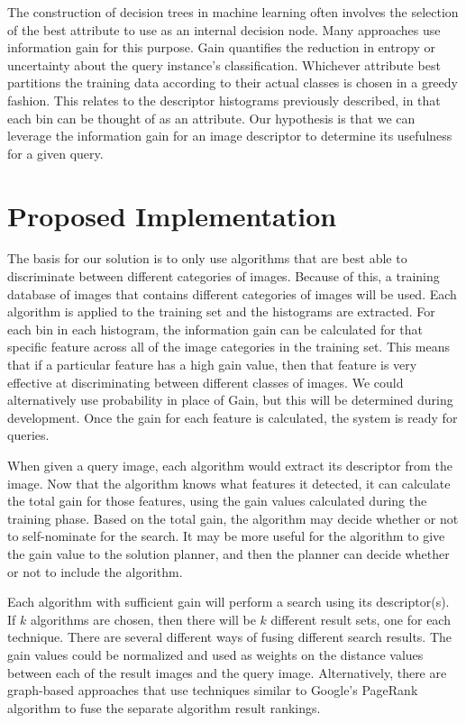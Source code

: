 \documentclass[12pt]{article}
\begin{document}
The construction of decision trees in machine learning often involves the selection of the best attribute to use as an internal decision node. Many approaches use information gain for this purpose. Gain quantifies the reduction in entropy or uncertainty about the query instance's classification. Whichever attribute best partitions the training data according to their actual classes is chosen in a greedy fashion. This relates to the descriptor histograms previously described, in that each bin can be thought of as an attribute. Our hypothesis is that we can leverage the information gain for an image descriptor to determine its usefulness for a given query.

\section{Proposed Implementation}
The basis for our solution is to only use algorithms that are best able to discriminate between different categories of images. Because of this, a training database of images that contains different categories of images will be used. Each algorithm is applied to the training set and the histograms are extracted. For each bin in each histogram, the information gain can be calculated for that specific feature across all of the image categories in the training set. This means that if a particular feature has a high gain value, then that feature is very effective at discriminating between different classes of images. We could alternatively use probability in place of Gain, but this will be determined during development. Once the gain for each feature is calculated, the system is ready for queries.

When given a query image, each algorithm would extract its descriptor from the image. Now that the algorithm knows what features it detected, it can calculate the total gain for those features, using the gain values calculated during the training phase. Based on the total gain, the algorithm may decide whether or not to self-nominate for the search. It may be more useful for the algorithm to give the gain value to the solution planner, and then the planner can decide whether or not to include the algorithm.

Each algorithm with sufficient gain will perform a search using its descriptor(s). If $k$ algorithms are chosen, then there will be $k$ different result sets, one for each technique. There are several different ways of fusing different search results. The gain values could be normalized and used as weights on the distance values between each of the result images and the query image. Alternatively, there are graph-based approaches that use techniques similar to Google's PageRank algorithm to fuse the separate algorithm result rankings.
\end{document}
